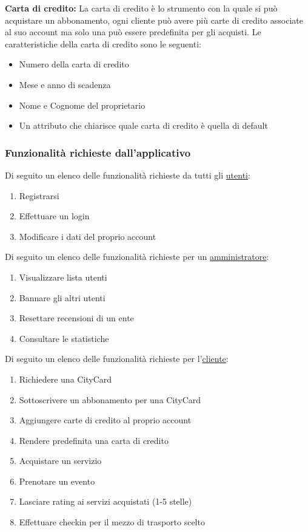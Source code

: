 \textbf{Carta di credito:} La carta di credito è lo strumento con la quale si può acquistare un abbonamento, ogni cliente può avere più carte di credito associate al suo account ma solo una può essere predefinita per gli acquisti.
Le caratteristiche della carta di credito sono le seguenti:
\begin{itemize}
    \item Numero della carta di credito
    \item Mese e anno di scadenza
    \item Nome e Cognome del proprietario
    \item Un attributo che chiarisce quale carta di credito è quella di default
\end{itemize}




\vspace{0.5cm}
\subsubsection{Funzionalità richieste dall'applicativo}


Di seguito un elenco delle funzionalità richieste da tutti gli \ul{utenti}:
\begin{enumerate}[label=u\arabic*)]
    \item Registrarsi
    \item Effettuare un login
    \item Modificare i dati del proprio account
\end{enumerate}

\vspace{0.5cm}


Di seguito un elenco delle funzionalità richieste per un \ul{amministratore}:
\begin{enumerate}[label=a\arabic*)]
    \item Visualizzare lista utenti
    \item Bannare gli altri utenti
    \item Resettare recensioni di un ente
    \item Consultare le statistiche
\end{enumerate}

\vspace{0.5cm}


Di seguito un elenco delle funzionalità richieste per l'\ul{cliente}:
\begin{enumerate}[label=c\arabic*)]
    \item Richiedere una CityCard
    \item Sottoscrivere un abbonamento per una CityCard
    \item Aggiungere carte di credito al proprio account
    \item Rendere predefinita una carta di credito
    \item Acquistare un servizio
    \item Prenotare un evento
    \item Lasciare rating ai servizi acquistati (1-5 stelle)
    \item Effettuare checkin per il mezzo di trasporto scelto
\end{enumerate}



